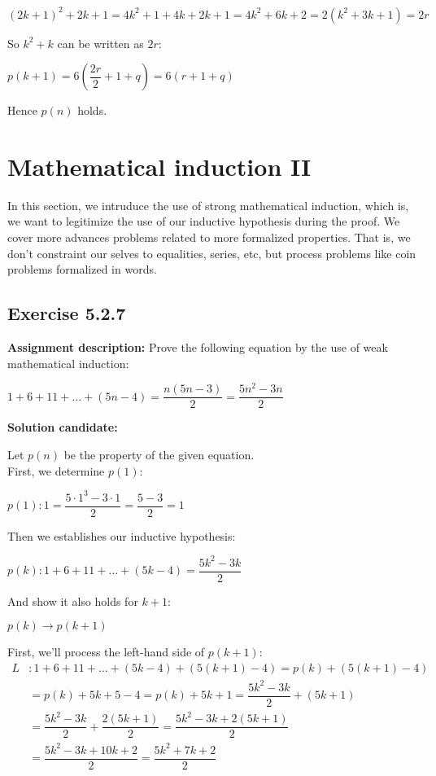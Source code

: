 \documentclass{report}
\newcommand{\cent}[1]{\begin{center}#1\end{center}}
\newcommand{\mAlign}[1]{\begin{align*}#1\end{align*}}
\newcommand{\AssignmentDescription}{\textbf{Assignment description: }}
\newcommand{\Solution}{\textbf{Solution candidate: }}
\newcommand{\QED}{\boxed{}}
\newcommand{\Exercise}[1]{\subsection{Exercise #1}}
\newcommand{\parenthesis}[1]{\left( #1 \right)}
\begin{document}
 	\cent{$(2k+1)^2 + 2k+1 = 4k^2+1+4k + 2k + 1 = 4k^2+6k+2 = 2(k^2+3k+1) = 2r$}
 	
 	So $k^2+k$ can be written as $2r$:
 	
 	\cent{$p(k+1) = 6\parenthesis{\dfrac{2r}{2} +1+ q} = 6(r+1+q)$}
 	
 	Hence $p(n)$ holds.\\
 	\QED
 	
 	\section{Mathematical induction II}
 	
 	In this section, we intruduce the use of strong mathematical induction, which is, we want to legitimize the use of our inductive hypothesis during the proof. We cover more advances problems related to more formalized properties. That is, we don't constraint our selves to equalities, series, etc, but process problems like coin problems formalized in words.
 	
 	\Exercise{5.2.7}
 	
 	\AssignmentDescription
 	Prove the following equation by the use of weak mathematical induction:
 	
 	\cent{$1 + 6 + 11 + \dots + (5n-4) = \dfrac{n(5n-3)}{2} = \dfrac{5n^2-3n}{2}$}
 	
 	\Solution
 	
 	Let $p(n)$ be the property of the given equation.\\
 	
 	First, we determine $p(1)$:
 	
 	\cent{$p(1) : 1 = \dfrac{5 \cdot 1^3 -3\cdot 1}{2} = \dfrac{5-3}{2} = 1$}
 	
 	Then we establishes our inductive hypothesis:
 	
 	\cent{$p(k) : 1 + 6 + 11 + \dots + (5k-4) = \dfrac{5k^2-3k}{2}$}
 	
 	And show it also holds for $k+1$:
 	
 	\cent{$p(k) \to p(k+1)$}
 	
 	First, we'll process the left-hand side of $p(k+1)$:
 	\mAlign{
 		L &:  1 + 6 + 11 + \dots + (5k-4) + (5(k+1)-4) = p(k) + (5(k+1)-4) \\
 		&= p(k) + 5k+5-4 = p(k) + 5k+1 =  \dfrac{5k^2-3k}{2} + (5k+1) \\
 		&= \dfrac{5k^2-3k}{2} + \dfrac{2(5k+1)}{2} = \dfrac{5k^2-3k + 2(5k+1)}{2} \\
 		&= \dfrac{5k^2-3k + 10k+2}{2} = \dfrac{5k^2+ 7k+2}{2}
 	}
 	
\end{document}
